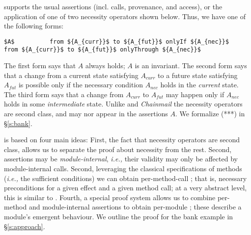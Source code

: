  

\Chainspec supports the usual assertions (incl. calls, provenance,
and access), or the application of one of two necessity operators shown below.
Thus, we  have one of the following forms:
\begin{lstlisting}[mathescape=true, language=chainmail, frame=lines]
       $A$          from ${A_{curr}}$ to ${A_{fut}}$ onlyIf ${A_{nec}}$          from ${A_{curr}}$ to ${A_{fut}}$ onlyThrough ${A_{nec}}$
\end{lstlisting}
%
The first form says that $A$ always holds;  $A$ is an invariant.
The second form says that  a change from a current state satisfying $A_{curr}$ to a future
state satisfying $A_{fut}$ %
is possible only if the necessary condition
$A_{nec}$ holds in the \emph{current} state.
The third form says that a change from %
$A_{curr}$ to %
$A_{fut}$  may happen only if %
$A_{nec}$ holds in some \emph{intermediate} state.
Unlike  {} and  \emph{Chainmail} 
 the necessity operators%
 are second class, and may nor appear in the assertions $A$.
We formalize (***) %
in  \S\ref{s:bank}.


 
\Chainlogic is based on four main ideas: 
First,  the fact that necessity operators are second class, allows us to 
 separate the proof about necessity from the rest.
 Second, assertions may be \emph{module-internal}, \textit{i.e.,}
their validity may only be affected by module-internal calls. 
Second, leveraging the classical  specifications of methods 
(\textit{i.e.,} the sufficient conditions) we can obtain per-method-call
 \NecessitySpecifications; that is, necessary preconditions
  for a given effect and a given method call;  at a very abstract level, this is
similar to  \cite{threoremsFreeSep}.
Fourth,  a special proof system allows us to combine 
per-method
 \NecessitySpecifications and module-internal assertions 
 to obtain per-module   \NecessitySpecifications; these describe a module's
 emergent behaviour.
We outline the proof for the bank example in  \S\ref{s:approach}.
 
